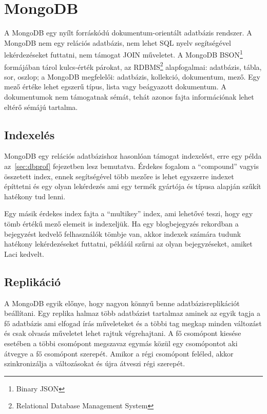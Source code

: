 \section{MongoDB}

A MongoDB egy nyílt forráskódú dokumentum-orientált adatbázis rendszer. A MongoDB nem egy relációs adatbázis, nem lehet SQL nyelv segítségével lekérdezéseket futtatni, nem támogat JOIN műveletet. A MongoDB BSON\footnote{Binary JSON} formájában tárol kulcs-érték párokat, az RDBMS\footnote{Relational Database Management System} alapfogalmai: adatbázis, tábla, sor, oszlop; a MongoDB megfelelői: adatbázis, kollekció, dokumentum, mező. Egy mező értéke lehet egszerű típus, lista vagy beágyazott dokumentum. A dokumentumok nem támogatnak sémát, tehát azonos fajta információnak lehet eltérő sémájú tartalma. 


\subsection{Indexelés}

MongoDB egy relációs adatbázishoz hasonlóan támogat indexelést, erre egy példa az~\ref{sec:dbprof} fejezetben lesz bemutatva. Érdekes fogalom a ``compound'' vagyis összetett index, ennek segítségével több mezőre is lehet egyszerre indexet építtetni és egy olyan lekérdezés ami egy termék gyártója és típusa alapján szűkít hatékony tud lenni.

Egy másik érdekes index fajta a ``multikey'' index, ami lehetővé teszi, hogy egy tömb értékű mező elemeit is indexeljük. Ha egy blogbejegyzés rekordban a bejegyzést kedvelő felhasználók tömbje van, akkor indexek számára tudunk hatékony lekérdezéseket futtatni, példáúl szűrni az olyan bejegyzéseket, amiket Laci kedvelt.

\subsection{Replikáció}

A MongoDB egyik előnye, hogy nagyon könnyű benne adatbázisreplikációt beállítani. Egy replika halmaz több adatbázist tartalmaz aminek az egyik tagja a fő adatbázis ami elfogad írás műveleteket és a többi tag megkap minden változást és csak olvasás műveletet lehet rajtuk végrehajtani. A fő csomópont kiesése esetében a többi csomópont megszavaz egymás közül egy csomópontot aki átvegye a fő csomópont szerepét. Amikor a régi csomópont feléled, akkor szinkronizálja a változásokat és újra átveszi régi szerepét.

